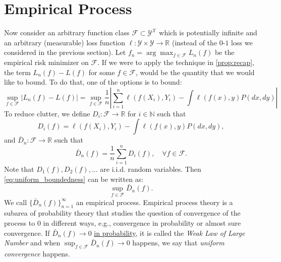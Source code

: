 \documentclass[twoside]{article}
\begin{document}
\section{Empirical Process}
Now consider an arbitrary function class $\mathcal F\subset \mathcal Y^\mathcal X$ which is potentially infinite and an arbitrary (measurable) loss function $\ell:\mathcal Y\times\mathcal Y \to \mathbb R$ (instead of the $0$-$1$ loss we considered in the previous section). Let $f_n=\arg\max_{f\in \mathcal F}L_n(f)$ be the empirical risk minimizer on $\mathcal F$. If we were to apply the technique in \cref{prop:recap}, the term $L_n(f) - L(f)$ for some $f\in \mathcal F$, would be the quantity that we would like to bound. To do that, one of the options is to bound:
\begin{equation}
   \sup_{f\in \mathcal F}|L_n(f)-L(f)|=\sup_{f\in \mathcal F}\frac{1}{n} \left|\sum_{i=1}^n\ell(f(X_i),Y_i) - \int\ell(f(x),y)P(dx,dy)\right|\label{eq:uniform_boundedness}
\end{equation}
To reduce clutter, we define $D_i:\mathcal F\to\mathbb R$ for $i\in \mathbb N$ such that
\begin{equation*}
   D_i(f) = \ell(f(X_i),Y_i) - \int\ell(f(x),y)P(dx,dy),
\end{equation*}
and $\bar D_n:\mathcal F\to\mathbb R$ such that
\begin{equation*}
    \bar D_n(f) = \frac{1}{n}\sum_{i=1}^n D_i(f),\quad \forall f\in \mathcal F.
\end{equation*}
Note that $D_1(f), D_2(f),...$ are i.i.d. random variables. Then \cref{eq:uniform_boundedness} can be written as:
\begin{equation*}
   \sup_{f\in \mathcal F}\bar D_n(f).
\end{equation*}
We call $\{\bar D_n(f)\}_{n=1}^\infty$ an empirical process. Empirical process theory is a subarea of probability theory that studies the question of convergence of the process to $0$ in different ways, e.g., convergence in probability or almost sure convergence. If $\bar D_n(f)\to 0$ \href{https://en.wikipedia.org/wiki/Convergence_of_random_variables#Convergence_in_probability}{in probability}, it is called the \textit{Weak Law of Large Number} and when $\sup_{f\in \mathcal F}\bar D_n(f)\to 0$ happens, we say that \textit{uniform convergence} happens.
\end{document}
